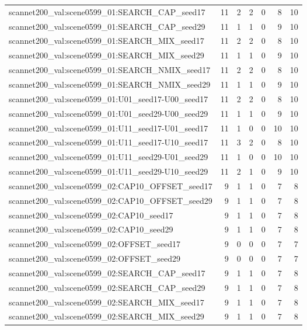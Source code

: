 \begin{table}[t]
\begin{tabular}{lrrrrrr}
scannet200\_val:scene0599\_01:SEARCH\_CAP\_seed17 & 11 & 2 & 2 & 0 & 8 & 10 \\
scannet200\_val:scene0599\_01:SEARCH\_CAP\_seed29 & 11 & 1 & 1 & 0 & 9 & 10 \\
scannet200\_val:scene0599\_01:SEARCH\_MIX\_seed17 & 11 & 2 & 2 & 0 & 8 & 10 \\
scannet200\_val:scene0599\_01:SEARCH\_MIX\_seed29 & 11 & 1 & 1 & 0 & 9 & 10 \\
scannet200\_val:scene0599\_01:SEARCH\_NMIX\_seed17 & 11 & 2 & 2 & 0 & 8 & 10 \\
scannet200\_val:scene0599\_01:SEARCH\_NMIX\_seed29 & 11 & 1 & 1 & 0 & 9 & 10 \\
scannet200\_val:scene0599\_01:U01\_seed17-U00\_seed17 & 11 & 2 & 2 & 0 & 8 & 10 \\
scannet200\_val:scene0599\_01:U01\_seed29-U00\_seed29 & 11 & 1 & 1 & 0 & 9 & 10 \\
scannet200\_val:scene0599\_01:U11\_seed17-U01\_seed17 & 11 & 1 & 0 & 0 & 10 & 10 \\
scannet200\_val:scene0599\_01:U11\_seed17-U10\_seed17 & 11 & 3 & 2 & 0 & 8 & 10 \\
scannet200\_val:scene0599\_01:U11\_seed29-U01\_seed29 & 11 & 1 & 0 & 0 & 10 & 10 \\
scannet200\_val:scene0599\_01:U11\_seed29-U10\_seed29 & 11 & 2 & 1 & 0 & 9 & 10 \\
scannet200\_val:scene0599\_02:CAP10\_OFFSET\_seed17 & 9 & 1 & 1 & 0 & 7 & 8 \\
scannet200\_val:scene0599\_02:CAP10\_OFFSET\_seed29 & 9 & 1 & 1 & 0 & 7 & 8 \\
scannet200\_val:scene0599\_02:CAP10\_seed17 & 9 & 1 & 1 & 0 & 7 & 8 \\
scannet200\_val:scene0599\_02:CAP10\_seed29 & 9 & 1 & 1 & 0 & 7 & 8 \\
scannet200\_val:scene0599\_02:OFFSET\_seed17 & 9 & 0 & 0 & 0 & 7 & 7 \\
scannet200\_val:scene0599\_02:OFFSET\_seed29 & 9 & 0 & 0 & 0 & 7 & 7 \\
scannet200\_val:scene0599\_02:SEARCH\_CAP\_seed17 & 9 & 1 & 1 & 0 & 7 & 8 \\
scannet200\_val:scene0599\_02:SEARCH\_CAP\_seed29 & 9 & 1 & 1 & 0 & 7 & 8 \\
scannet200\_val:scene0599\_02:SEARCH\_MIX\_seed17 & 9 & 1 & 1 & 0 & 7 & 8 \\
scannet200\_val:scene0599\_02:SEARCH\_MIX\_seed29 & 9 & 1 & 1 & 0 & 7 & 8 \\

\end{tabular}
\end{table}
